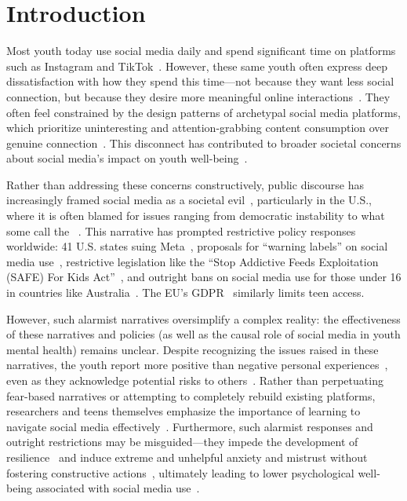 \section{Introduction}
Most youth today use social media daily and spend significant time on platforms such as Instagram and TikTok~\cite{AndersonAnderson-2023-TeensSocial2023-s}. However, these same youth often express deep dissatisfaction with how they spend this time---not because they want less social connection, but because they desire more meaningful online interactions~\cite{HinikerKim-2024-SharingDesign-x}. They often feel constrained by the design patterns of archetypal social media platforms, which prioritize uninteresting and attention-grabbing content consumption over genuine connection~\cite{Landesman-2024-IInstagram-j}. This disconnect has contributed to broader societal concerns about social media's impact on youth well-being~\cite{OtherOther-2023-SocialMediaAdvisory-u}.

Rather than addressing these concerns constructively, public discourse has increasingly framed social media as a societal evil~\cite{Wike-2022-2ViewsSociety-y}, particularly in the U.S., where it is often blamed for issues ranging from democratic instability to what some call the ~\cite{Haidt-2023-SocialMediaEvidence-c}. This narrative has prompted restrictive policy responses worldwide: 41 U.S. states suing Meta~\cite{meta-sue}, proposals for ``warning labels'' on social media use~\cite{Murthy-2024-SurgeonGeneralPlatforms-q}, restrictive legislation like the ``Stop Addictive Feeds Exploitation (SAFE) For Kids Act''~\cite{Other-Other-NYState2023-S7694A-p}, and outright bans on social media use for those under 16 in countries like Australia~\cite{Kim-2024-AustraliaBarred-y}. The EU's GDPR~\cite{gdpr} similarly limits teen access.

However, such alarmist narratives oversimplify a complex reality: the effectiveness of these narratives and policies (as well as the causal role of social media in youth mental health) remains unclear. Despite recognizing the issues raised in these narratives, the youth report more positive than negative personal experiences~\cite{Vogels-2023-TeensSocialSurveys-n}, even as they acknowledge potential risks to others~\cite{Vogels-2023-TeensSocialSurveys-n}. Rather than perpetuating fear-based narratives or attempting to completely rebuild existing platforms, researchers and teens themselves emphasize the importance of learning to navigate social media effectively~\cite{WilsonWisniewski-2012-FightingMyRegulation-m, Wisniewski-2018-PrivacyParadox-l, TheLearningNetwork-2025-WhatTeensMedia-z}. Furthermore, such alarmist responses and outright restrictions may be misguided---they impede the development of resilience~\cite{Wisniewski2018-rc} and induce extreme and unhelpful anxiety and mistrust without fostering constructive actions~\cite{kim2024privacysocialnormsystematically}, ultimately leading to lower psychological well-being associated with social media use~\cite{lee2024social}. 

